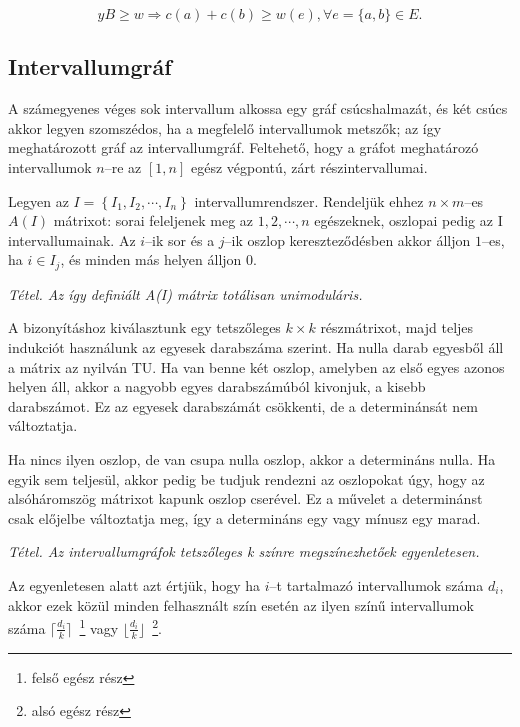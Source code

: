 \[ yB \geq w \Rightarrow c(a) + c(b) \geq w(e), \forall e=\{a,b\}\in E.\]

\subsection{Intervallumgráf}

A számegyenes véges sok intervallum alkossa egy gráf csúcshalmazát, és két csúcs
akkor legyen szomszédos, ha a megfelelő intervallumok metszők; az így
meghatározott gráf az intervallumgráf. Feltehető, hogy a gráfot meghatározó
intervallumok $n$--re az $[1,n]$ egész végpontú, zárt részintervallumai.

Legyen az $I=\left\{I_1, I_2, \cdots, I_n\right\}$ intervallumrendszer.
Rendeljük ehhez $n \times m$--es $A(I)$ mátrixot: sorai feleljenek meg az
$1,2,\cdots,n$ egészeknek, oszlopai pedig az I intervallumainak. Az $i$--ik sor
és a $j$--ik oszlop kereszteződésben akkor álljon $1$--es, ha $i \in I_j$, és
minden más helyen álljon $0$.
\vspace{0.4cm}

\emph{Tétel. Az így definiált A(I) mátrix totálisan unimoduláris.}
\vspace{0.4cm}

A bizonyításhoz kiválasztunk egy tetszőleges $k \times k$ részmátrixot, majd
teljes indukciót használunk az egyesek darabszáma szerint. Ha nulla darab
egyesből áll a mátrix az nyilván TU. Ha van benne két oszlop, amelyben az első
egyes azonos helyen áll, akkor a nagyobb egyes darabszámúból kivonjuk, a kisebb
darabszámot. Ez az egyesek darabszámát csökkenti, de a determinánsát nem
változtatja.

Ha nincs ilyen oszlop, de van csupa nulla oszlop, akkor a determináns nulla. Ha
egyik sem teljesül, akkor pedig be tudjuk rendezni az oszlopokat úgy, hogy az
alsóháromszög mátrixot kapunk oszlop cserével. Ez a művelet a determinánst csak
előjelbe változtatja meg, így a determináns egy vagy mínusz egy marad.
\vspace{0.4cm}

\emph{Tétel. Az intervallumgráfok tetszőleges k színre megszínezhetőek
egyenletesen.}
\vspace{0.4cm}

Az egyenletesen alatt azt értjük, hogy ha $i$--t tartalmazó intervallumok száma
$d_i$, akkor ezek közül minden felhasznált szín esetén az ilyen színű
intervallumok száma $\lceil \frac{d_i}{k} \rceil$~\footnote{felső egész rész}
vagy $\lfloor \frac{d_i}{k} \rfloor$~\footnote{alsó egész rész}.

